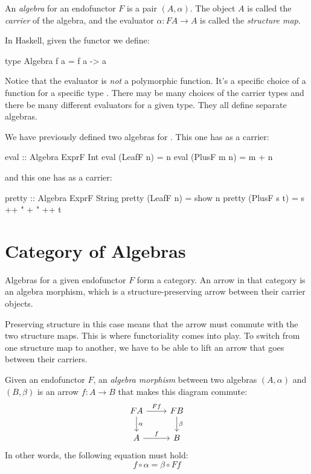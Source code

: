 \documentclass[DaoFP]{subfiles}
\begin{document}
An \emph{algebra} for an endofunctor $F$ is a pair $(A, \alpha)$. The object $A$ is called the \emph{carrier} of the algebra, and the evaluator $\alpha \colon F A \to A$ is called the \emph{structure map}.

In Haskell, given the functor  we define:
\begin{haskell}
type Algebra f a = f a -> a
\end{haskell}

Notice that the evaluator is \emph{not} a polymorphic function. It's a specific choice of a function for a specific type . There may be many choices of the carrier types and there be many different evaluators for a given type. They all define separate algebras.

We have previously defined two algebras for . This one has  as a carrier:
\begin{haskell}
eval :: Algebra ExprF Int
eval (LeafF n)   = n
eval (PlusF m n) = m + n
\end{haskell}
and this one has  as a carrier:
\begin{haskell}
pretty :: Algebra ExprF String
pretty (LeafF n)   = show n
pretty (PlusF s t) = s ++ " + " ++ t
\end{haskell}

\section{Category of Algebras}

Algebras for a given endofunctor $F$ form a category. An arrow in that category is an algebra morphism, which is a structure-preserving arrow between their carrier objects. 

Preserving structure in this case means that the arrow must commute with the two structure maps. This is where functoriality comes into play. To switch from one structure map to another, we have to be able to lift an arrow that goes between their carriers. 

Given an endofunctor $F$, an \emph{algebra morphism} between two algebras $(A, \alpha)$ and $(B, \beta)$ is an arrow $f \colon A \to B$ that makes this diagram commute:
\[
 \begin{tikzcd}
 F A 
 \arrow[r, "F f"]
 \arrow[d, "\alpha"]
 & F B
\arrow[d, "\beta"]
 \\
 A
 \arrow[r, "f"]
 & B
  \end{tikzcd}
\]
In other words, the following equation must hold:
\[f \circ \alpha = \beta \circ F f \]
\end{document}
